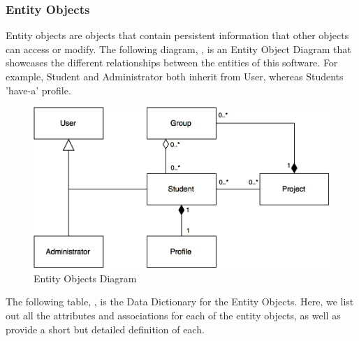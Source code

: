 \documentclass[12pt,letterpaper]{article}
\begin{document}
\subsubsection*{Entity Objects}

Entity objects are objects that contain persistent information that other objects can access or modify. The following diagram, , is an Entity Object Diagram
that showcases the different relationships between the entities of this software. For example, Student and Administrator both inherit from User, whereas Students 'have-a'
profile.

\begin{figure}[H]
	\centering{}
	\includegraphics[scale=0.35]{imgs/entity-object-diagram.png}
	\caption{Entity Objects Diagram}
\end{figure}

The following table, , is the Data Dictionary for the Entity Objects. Here, we list out all the attributes and associations for each of the entity objects, as well as provide
a short but detailed definition of each.
\end{document}
